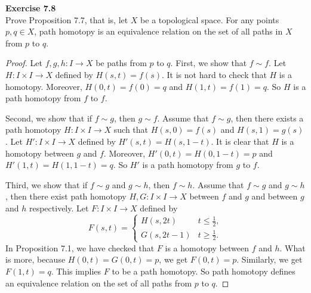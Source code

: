 \documentclass[12pt, a4paper]{article}
\theoremstyle{plain}
\newenvironment{exercise}[2][Exercise]
    { \begin{mdframed}[backgroundcolor=gray!20] \textbf{#1 #2} \\}
    {  \end{mdframed}}
\begin{document}
\begin{exercise}{7.8}
    Prove Proposition 7.7, that is, let $X$ be a topological space. For any points $p,q\in X$, path homotopy is an equivalence relation on the set of all paths in $X$ from $p$ to $q$.
\end{exercise}
    \begin{proof}
        Let $f,g,h:I\to X$ be paths from $p$ to $q$. First, we show that $f\sim f$. Let $H\colon I\times I\to X$ defined by $H(s,t)=f(s)$. It is not hard to check that $H$ is a homotopy. Moreover, $H(0,t)=f(0)=q$ and $H(1,t)=f(1)=q$. So $H$ is a path homotopy from $f$ to $f$.

        Second, we show that if $f\sim g$, then $g\sim f$. Assume that $f\sim g$, then there exists a path homotopy $H\colon I\times I\to X$ such that $H(s,0)=f(s)$ and $H(s,1)=g(s)$. Let $H'\colon I\times I\to X$ defined by $H'(s,t)=H(s,1-t)$. It is clear that $H$ is a homotopy between $g$ and $f$. Moreover, $H'(0,t)=H(0,1-t)=p$ and $H'(1,t)=H(1,1-t)=q$. So $H'$ is a path homotopy from $g$ to $f$.

        Third, we show that if $f\sim g$ and $g\sim h$, then $f\sim h$. Assume that $f\sim g$ and $g\sim h$, then there exist path homotopy $H,G\colon I\times I\to X$ between $f$ and $g$ and between $g$ and $h$ respectively. Let $F\colon I\times I\to X$ defined by 
        \[
        F(s,t)=\begin{cases}
            H(s,2t) & t\leq \frac{1}{2},\\
            G(s,2t-1) &  t\geq \frac{1}{2}.
        \end{cases}
        \]
        In Proposition 7.1, we have checked that $F$ is a homotopy between $f$ and $h$. What is more, because $H(0,t)=G(0,t)=p$, we get $F(0,t)=p$. Similarly, we get $F(1,t)=q$. This implies $F$ to be a path homotopy. So path homotopy defines an equivalence relation on the set of all paths from $p$ to $q$.
    \end{proof}
\end{document}
